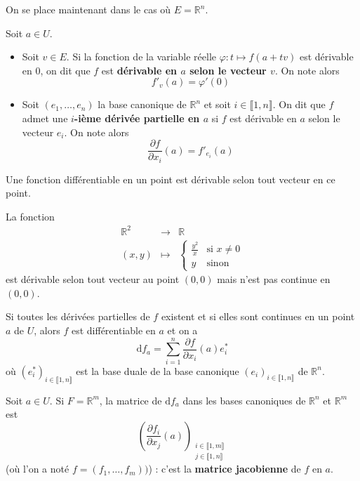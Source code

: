   On se place maintenant dans le cas où $E = \mathbb{R}^n$.

  \begin{definition}
    Soit $a \in U$.
    \begin{itemize}
      \item Soit $v \in E$. Si la fonction de la variable réelle $\varphi : t \mapsto f(a+tv)$ est dérivable en $0$, on dit que $f$ est \textbf{dérivable en $a$ selon le vecteur $v$}. On note alors
      \[ f'_v(a) = \varphi'(0) \]
      \item Soit $(e_1, \dots, e_n)$ la base canonique de $\mathbb{R}^n$ et soit $i \in \llbracket 1, n \rrbracket$. On dit que $f$ admet une \textbf{$i$-ième dérivée partielle en $a$} si $f$ est dérivable en $a$ selon le vecteur $e_i$. On note alors
      \[ \frac{\partial f}{\partial x_i}(a) = f'_{e_i}(a) \]
    \end{itemize}
  \end{definition}

  \begin{proposition}
    Une fonction différentiable en un point est dérivable selon tout vecteur en ce point.
  \end{proposition}

  \begin{cexample}
    La fonction
    \[
      \begin{array}{ccc}
        \mathbb{R}^2 &\rightarrow& \mathbb{R} \\
        (x,y) &\mapsto& \begin{cases}
          \frac{y^2}{x} &\text{si } x \neq 0 \\
          y &\text{sinon}
        \end{cases}
      \end{array}
    \]
    est dérivable selon tout vecteur au point $(0,0)$ mais n'est pas continue en $(0,0)$.
  \end{cexample}

  \begin{theorem}
    Si toutes les dérivées partielles de $f$ existent et si elles sont continues en un point $a$ de $U$, alors $f$ est différentiable en $a$ et on a
    \[ \mathrm{d}f_a = \sum_{i=1}^n \frac{\partial f}{\partial x_i}(a) e_i^* \]
    où $(e_i^*)_{i \in \llbracket 1, n \rrbracket}$ est la base duale de la base canonique $(e_i)_{i \in \llbracket 1, n \rrbracket}$ de $\mathbb{R}^n$.
  \end{theorem}

  \begin{application}
    Soit $a \in U$. Si $F = \mathbb{R}^m$, la matrice de $\mathrm{d}f_a$ dans les bases canoniques de $\mathbb{R}^n$ et $\mathbb{R}^m$ est
    \[ \left(\frac{\partial f_i}{\partial x_j}(a)\right)_{\substack{i \in \llbracket 1, m \rrbracket \\ j \in \llbracket 1, n \rrbracket}} \]
    (où l'on a noté $f = (f_1, \dots, f_m))$) : c'est la \textbf{matrice jacobienne} de $f$ en $a$.
  \end{application}

